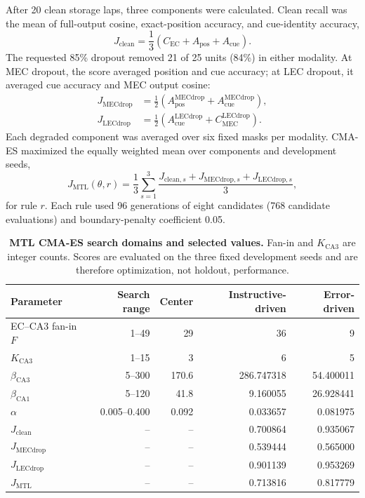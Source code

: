 After 20 clean storage laps, three components were calculated. Clean recall was
the mean of full-output cosine, exact-position accuracy, and cue-identity
accuracy,
\begin{equation}
J_{\mathrm{clean}}=\frac{1}{3}
(C_{\mathrm{EC}}+A_{\mathrm{pos}}+A_{\mathrm{cue}}).
\end{equation}
The requested 85\% dropout removed 21 of 25 units (84\%) in either modality.
At MEC dropout, the score averaged position and cue accuracy; at LEC
dropout, it averaged cue accuracy and MEC output cosine:
\begin{align}
J_{\mathrm{MECdrop}}&=\frac{1}{2}
(A_{\mathrm{pos}}^{\mathrm{MECdrop}}+
 A_{\mathrm{cue}}^{\mathrm{MECdrop}}),\\
J_{\mathrm{LECdrop}}&=\frac{1}{2}
(A_{\mathrm{cue}}^{\mathrm{LECdrop}}+
 C_{\mathrm{MEC}}^{\mathrm{LECdrop}}).
\end{align}
Each degraded component was averaged over six fixed masks per modality. CMA-ES
maximized the equally weighted mean over components and development seeds,
\begin{equation}
J_{\mathrm{MTL}}(\theta,r)=\frac{1}{3}\sum_{s=1}^{3}
\frac{J_{\mathrm{clean},s}+J_{\mathrm{MECdrop},s}+
J_{\mathrm{LECdrop},s}}{3},
\label{eq:mtl-evolution-fitness}
\end{equation}
for rule $r$. Each rule used 96 generations of eight candidates (768 candidate
evaluations) and boundary-penalty coefficient 0.05.

\begin{table}[H]
\centering
\small
\caption{\textbf{MTL CMA-ES search domains and selected values.} Fan-in and
$K_{\mathrm{CA3}}$ are integer counts. Scores are evaluated on the three fixed
development seeds and are therefore optimization, not holdout, performance.}
\label{tab:evolved-parameters}
\begin{tabular}{lrrrr}
\toprule
Parameter & Search range & Center & Instructive-driven & Error-driven \\
\midrule
EC--CA3 fan-in $F$ & 1--49 & 29 & 36 & 9 \\
$K_{\mathrm{CA3}}$ & 1--15 & 3 & 6 & 5 \\
$\beta_{\mathrm{CA3}}$ & 5--300 & 170.6 & 286.747318 & 54.400011 \\
$\beta_{\mathrm{CA1}}$ & 5--120 & 41.8 & 9.160055 & 26.928441 \\
$\alpha$ & 0.005--0.400 & 0.092 & 0.033657 & 0.081975 \\
\midrule
$J_{\mathrm{clean}}$ & -- & -- & 0.700864 & 0.935067 \\
$J_{\mathrm{MECdrop}}$ & -- & -- & 0.539444 & 0.565000 \\
$J_{\mathrm{LECdrop}}$ & -- & -- & 0.901139 & 0.953269 \\
$J_{\mathrm{MTL}}$ & -- & -- & 0.713816 & 0.817779 \\
\bottomrule
\end{tabular}
\end{table}

